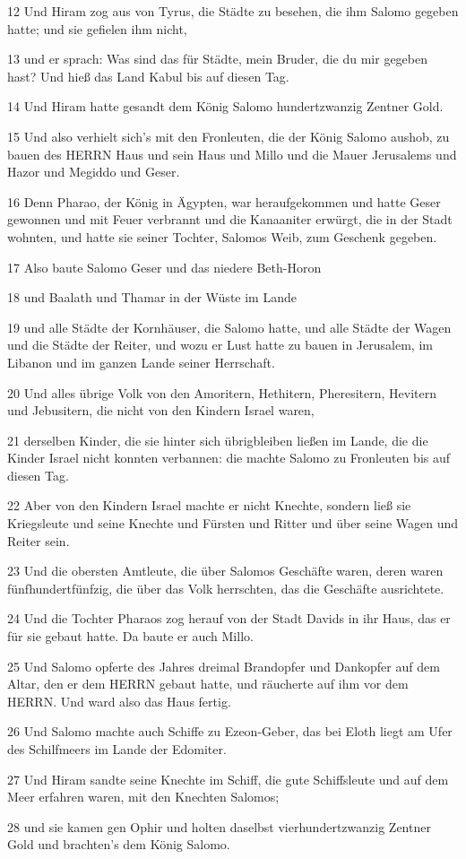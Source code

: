 \par 12 Und Hiram zog aus von Tyrus, die Städte zu besehen, die ihm Salomo gegeben hatte; und sie gefielen ihm nicht,
\par 13 und er sprach: Was sind das für Städte, mein Bruder, die du mir gegeben hast? Und hieß das Land Kabul bis auf diesen Tag.
\par 14 Und Hiram hatte gesandt dem König Salomo hundertzwanzig Zentner Gold.
\par 15 Und also verhielt sich's mit den Fronleuten, die der König Salomo aushob, zu bauen des HERRN Haus und sein Haus und Millo und die Mauer Jerusalems und Hazor und Megiddo und Geser.
\par 16 Denn Pharao, der König in Ägypten, war heraufgekommen und hatte Geser gewonnen und mit Feuer verbrannt und die Kanaaniter erwürgt, die in der Stadt wohnten, und hatte sie seiner Tochter, Salomos Weib, zum Geschenk gegeben.
\par 17 Also baute Salomo Geser und das niedere Beth-Horon
\par 18 und Baalath und Thamar in der Wüste im Lande
\par 19 und alle Städte der Kornhäuser, die Salomo hatte, und alle Städte der Wagen und die Städte der Reiter, und wozu er Lust hatte zu bauen in Jerusalem, im Libanon und im ganzen Lande seiner Herrschaft.
\par 20 Und alles übrige Volk von den Amoritern, Hethitern, Pheresitern, Hevitern und Jebusitern, die nicht von den Kindern Israel waren,
\par 21 derselben Kinder, die sie hinter sich übrigbleiben ließen im Lande, die die Kinder Israel nicht konnten verbannen: die machte Salomo zu Fronleuten bis auf diesen Tag.
\par 22 Aber von den Kindern Israel machte er nicht Knechte, sondern ließ sie Kriegsleute und seine Knechte und Fürsten und Ritter und über seine Wagen und Reiter sein.
\par 23 Und die obersten Amtleute, die über Salomos Geschäfte waren, deren waren fünfhundertfünfzig, die über das Volk herrschten, das die Geschäfte ausrichtete.
\par 24 Und die Tochter Pharaos zog herauf von der Stadt Davids in ihr Haus, das er für sie gebaut hatte. Da baute er auch Millo.
\par 25 Und Salomo opferte des Jahres dreimal Brandopfer und Dankopfer auf dem Altar, den er dem HERRN gebaut hatte, und räucherte auf ihm vor dem HERRN. Und ward also das Haus fertig.
\par 26 Und Salomo machte auch Schiffe zu Ezeon-Geber, das bei Eloth liegt am Ufer des Schilfmeers im Lande der Edomiter.
\par 27 Und Hiram sandte seine Knechte im Schiff, die gute Schiffsleute und auf dem Meer erfahren waren, mit den Knechten Salomos;
\par 28 und sie kamen gen Ophir und holten daselbst vierhundertzwanzig Zentner Gold und brachten's dem König Salomo.


